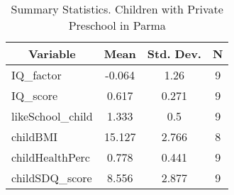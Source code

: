 
\begin{table}[htbp]\centering \caption{Summary Statistics. Children with Private Preschool in Parma \label{bothChildmaternaPrivParma}}
\begin{tabular}{l c c  c}\hline\hline
\multicolumn{1}{c}{\textbf{Variable}} & \textbf{Mean}
 & \textbf{Std. Dev.} & \textbf{N}\\ \hline
IQ\_factor & -0.064 & 1.26  & 9\\
IQ\_score & 0.617 & 0.271  & 9\\
likeSchool\_child & 1.333 & 0.5  & 9\\
childBMI & 15.127 & 2.766  & 8\\
childHealthPerc & 0.778 & 0.441  & 9\\
childSDQ\_score & 8.556 & 2.877  & 9\\
\hline\end{tabular}
\end{table}
